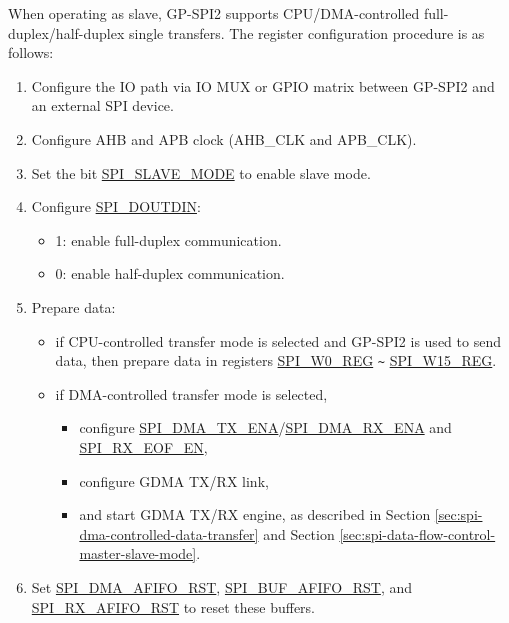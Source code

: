 \documentclass[main\_\_EN.tex]{subfiles}
\begin{document}
When operating as slave, GP-SPI2 supports CPU/DMA-controlled full-duplex/half-duplex single transfers. The register configuration procedure is as follows:
\begin{enumerate}
    \item Configure the IO path via IO MUX or GPIO matrix between GP-SPI2 and an external SPI device.

    \item Configure AHB and APB clock (AHB\_CLK and APB\_CLK).

    \item Set the bit \hyperref[fielddesc:SPISLAVEMODE]{SPI\_SLAVE\_MODE} to enable slave mode.

    \item Configure \hyperref[fielddesc:SPIDOUTDIN]{SPI\_DOUTDIN}:
    \begin{itemize}
        \item 1: enable full-duplex communication.
        \item 0: enable half-duplex communication.
    \end{itemize}

    \item Prepare data:
    \begin{itemize}
        \item if CPU-controlled transfer mode is selected and GP-SPI2 is used to send data, then prepare data in registers \hyperref[regdesc:SPIW0REG]{SPI\_W0\_REG} \verb+~+ \hyperref[regdesc:SPIW0REG]{SPI\_W15\_REG}.
        \item if DMA-controlled transfer mode is selected,
        \begin{itemize}
            \item configure \hyperref[fielddesc:SPIDMATXENA]{SPI\_DMA\_TX\_ENA}/\hyperref[fielddesc:SPIDMARXENA]{SPI\_DMA\_RX\_ENA} and \hyperref[fielddesc:SPIRXEOFEN]{SPI\_RX\_EOF\_EN},
            \item configure GDMA TX/RX link,
            \item and start GDMA TX/RX engine, as described in Section \ref{sec:spi-dma-controlled-data-transfer} and Section \ref{sec:spi-data-flow-control-master-slave-mode}.
        \end{itemize}
    \end{itemize}

    \item Set \hyperref[fielddesc:SPIDMAAFIFORST]{SPI\_DMA\_AFIFO\_RST}, \hyperref[fielddesc:SPIBUFAFIFORST]{SPI\_BUF\_AFIFO\_RST}, and \hyperref[fielddesc:SPIRXAFIFORST]{SPI\_RX\_AFIFO\_RST} to reset these buffers.


\end{enumerate}
\end{document}
